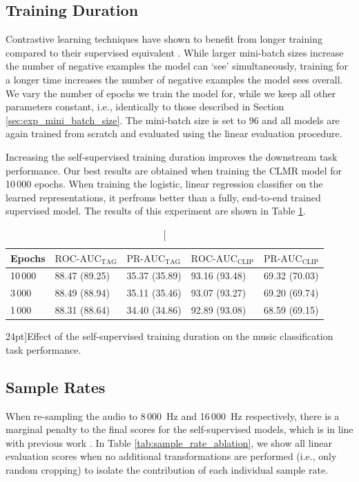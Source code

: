 \subsection{Training Duration}
Contrastive learning techniques have shown to benefit from longer training compared to their supervised equivalent \cite{chen_simple_2020}. While larger mini-batch sizes increase the number of negative examples the model can `see' simultaneously, training for a longer time increases the number of negative examples the model sees overall. We vary the number of epochs we train the model for, while we keep all other parameters constant, i.e., identically to those described in Section \ref{sec:exp_mini_batch_size}. The mini-batch size is set to 96 and all models are again trained from scratch and evaluated using the linear evaluation procedure.

Increasing the self-supervised training duration improves the downstream task performance. Our best results are obtained when training the CLMR model for 10\,000 epochs. When training the logistic, linear regression classifier on the learned representations, it perfroms better than a fully, end-to-end trained supervised model. The results of this experiment are shown in Table \ref{tab:epoch_ablation}.


\begin{table}
    \centering
    \begin{tabular}{lllll}\toprule
    Epochs & $\text{ROC-AUC}_{\text{TAG}}$ & $\text{PR-AUC}_{\text{TAG}}$ & $\text{ROC-AUC}_{\text{CLIP}}$ & $\text{PR-AUC}_{\text{CLIP}}$ \\\midrule
    10\,000 & 88.47 (89.25) & 35.37 (35.89) & 93.16 (93.48) & 69.32 (70.03) \\
    3\,000 & 88.49 (88.94) & 35.11 (35.46) & 93.07 (93.27) & 69.20 (69.74) \\
    1\,000 & 88.31 (88.64) & 34.40 (34.86) & 92.89 (93.08) & 68.59 (69.15) \\\bottomrule
    \end{tabular}
    \caption[][24pt]{Effect of the self-supervised training duration on the music classification task performance.}
    \label{tab:epoch_ablation}
\end{table}




\subsection{Sample Rates}    
When re-sampling the audio to 8\,000~Hz and 16\,000~Hz respectively, there is a marginal penalty to the final scores for the self-supervised models, which is in line with previous work \cite{lee2018samplecnn}. In Table \ref{tab:sample_rate_ablation}, we show all linear evaluation scores when no additional transformations are performed (i.e., only random cropping) to isolate the contribution of each individual sample rate.



